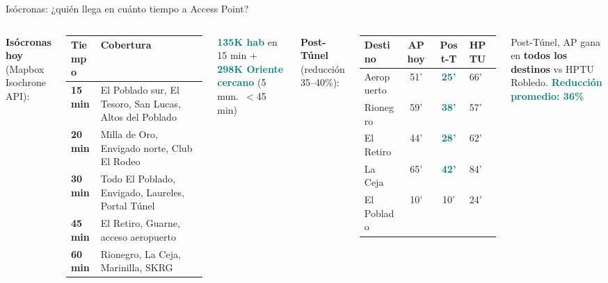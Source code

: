 \documentclass[aspectratio=169, 11pt]{beamer}
\newcommand{\highlight}[1]{\textcolor{teal}{\textbf{#1}}}
\newcommand{\src}[1]{\par\vspace{2pt}{\tiny\textcolor{slate}{Fuente: #1}}}
\begin{document}
\begin{frame}{Isócronas: ¿quién llega en cuánto tiempo a Access Point?}
\begin{columns}[T]
{\scriptsize\textbf{Isócronas hoy} (Mapbox Isochrone API):}

\vspace{2pt}
{\tiny
\begin{tabular}{@{}lp{5.2cm}@{}}
\toprule
\textbf{Tiempo} & \textbf{Cobertura} \\
\midrule
\rowcolor{teal!10}
\textbf{15 min} & El Poblado sur, El Tesoro, San Lucas, Altos del Poblado \\
\textbf{20 min} & Milla de Oro, Envigado norte, Club El Rodeo \\
\rowcolor{teal!6}
\textbf{30 min} & Todo El Poblado, Envigado, Laureles, Portal Túnel \\
\textbf{45 min} & El Retiro, Guarne, acceso aeropuerto \\
\rowcolor{amber!8}
\textbf{60 min} & Rionegro, La Ceja, Marinilla, SKRG \\
\bottomrule
\end{tabular}
}

\vspace{2pt}
{\scriptsize \highlight{135K hab} en 15 min + \highlight{298K Oriente cercano} (5 mun.\ $<$45 min)}

{\scriptsize\textbf{Post-Túnel} (reducción 35--40\%):}

\vspace{2pt}
{\tiny
\begin{tabular}{@{}lccl@{}}
\toprule
\textbf{Destino} & \textbf{AP hoy} & \textbf{Post-T} & \textbf{HPTU} \\
\midrule
\rowcolor{teal!8}
Aeropuerto & 51' & \highlight{25'} & 66' \\
Rionegro & 59' & \highlight{38'} & 57' \\
\rowcolor{teal!8}
El Retiro & 44' & \highlight{28'} & 62' \\
La Ceja & 65' & \highlight{42'} & 84' \\
\rowcolor{teal!6}
El Poblado & 10' & 10' & 24' \\
\bottomrule
\end{tabular}
}

\vspace{2pt}
\begin{exampleblock}{}
\centering\scriptsize
Post-Túnel, AP gana en \textbf{todos los destinos} vs HPTU Robledo. \highlight{Reducción promedio: 36\%}
\end{exampleblock}
\end{columns}
\src{Mapbox Isochrone/Matrix/Directions API, ANI/INVIAS proyección Túnel}
\end{frame}
\end{document}
